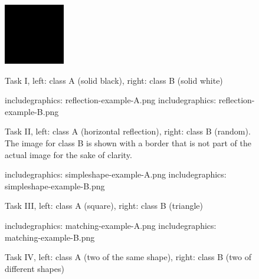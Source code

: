 \documentclass{article}
\newcommand{\tmpincludegraphics}[1][opt]{includegraphics: }
\begin{document}
\clearpage
{}
\pagestyle{empty}

\clearpage
\begin{figure}[ht]
  \centering
  \includegraphics[width=100px]{solidcolor-example-A.png}
  \hspace{100px}
  {%
    \setlength{\fboxrule}{1pt}%
  }%
  \label{fig:solidcolor-example}
  \caption{Task I, left: class A (solid black), right: class B (solid white)}
\end{figure}

\begin{figure}[ht]
  \centering
  \tmpincludegraphics[width=100px]{reflection-example-A.png}
  \hspace{100px}
  \tmpincludegraphics[width=100px]{reflection-example-B.png}
  \label{fig:reflection-example}
  \caption{Task II, left: class A (horizontal reflection), right: class B (random). The image for class B is shown with a border that is not part of the actual image for the sake of clarity.}
\end{figure}

\begin{figure}[ht]
  \centering
  \tmpincludegraphics[width=100px]{simpleshape-example-A.png}
  \hspace{100px}
  \tmpincludegraphics[width=100px]{simpleshape-example-B.png}
  \label{fig:simpleshape-example}
  \caption{Task III, left: class A (square), right: class B (triangle)}
\end{figure}

\begin{figure}[ht]
  \centering
  \tmpincludegraphics[width=100px]{matching-example-A.png}
  \hspace{100px}
  \tmpincludegraphics[width=100px]{matching-example-B.png}
  \label{fig:matching-example}
  \caption{Task IV, left: class A (two of the same shape), right: class B (two of different shapes)}
\end{figure}
\end{document}
